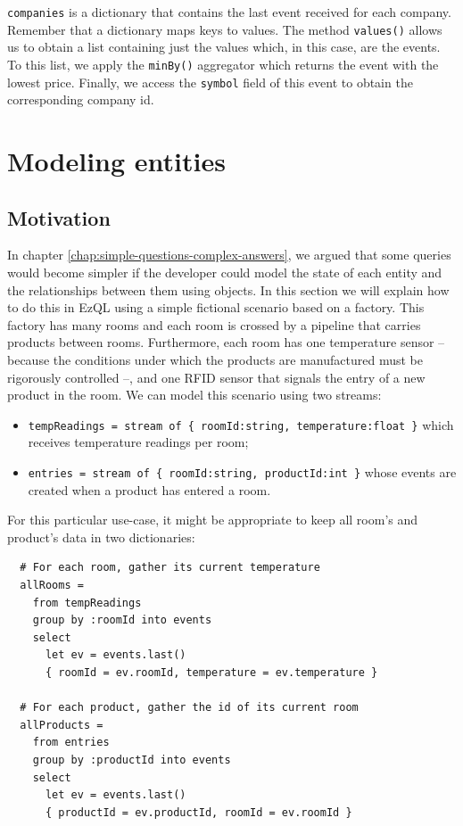 \verb=companies= is a dictionary that contains the last event received
for each company. Remember that a dictionary maps keys to values. The
method \verb=values()= allows us to obtain a list containing just the
values which, in this case, are the events. To this list, we apply the
\verb=minBy()= aggregator which returns the event with the lowest
price. Finally, we access the \verb=symbol= field of this event to
obtain the corresponding company id.


\section{Modeling entities}
\label{sec:entities}

\subsection{Motivation}

In chapter \ref{chap:simple-questions-complex-answers}, we argued that
some queries would become simpler if the developer could model the
state of each entity and the relationships between them using
objects. In this section we will explain how to do this in EzQL using
a simple fictional scenario based on a factory. This factory has many
rooms and each room is crossed by a pipeline that carries products
between rooms. Furthermore, each room has one temperature sensor --
because the conditions under which the products are manufactured must
be rigorously controlled --, and one RFID sensor that signals the
entry of a new product in the room. We can model this scenario using
two streams:

\begin{itemize}
\item
  \verb!tempReadings = stream of { roomId:string, temperature:float }! \linebreak which receives temperature readings per room;
\item \verb!entries = stream of { roomId:string, productId:int }! \linebreak whose events are
  created when a product has entered a room.
\end{itemize}

For this particular use-case, it might be appropriate to keep all
room's and product's data in two dictionaries:

\begin{lstlisting}
  # For each room, gather its current temperature
  allRooms =
    from tempReadings
    group by :roomId into events
    select
      let ev = events.last()
      { roomId = ev.roomId, temperature = ev.temperature }

  # For each product, gather the id of its current room
  allProducts =
    from entries
    group by :productId into events
    select
      let ev = events.last()
      { productId = ev.productId, roomId = ev.roomId }
\end{lstlisting}

